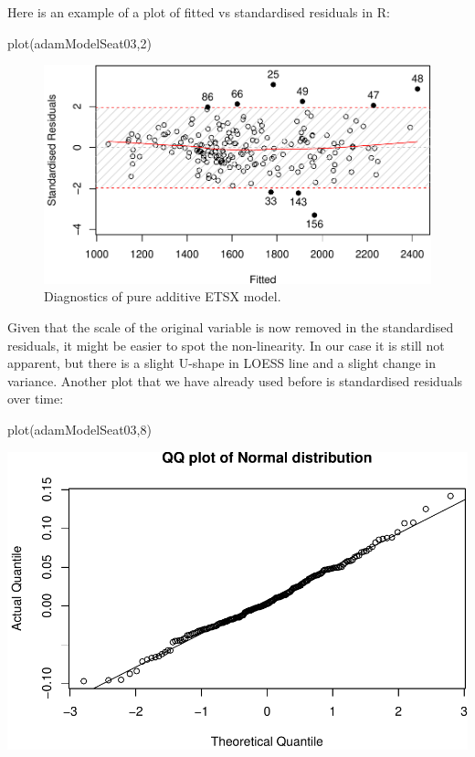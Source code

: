 \documentclass[
]{book}
\newenvironment{Shaded}{\begin{snugshade}}{\end{snugshade}}
\newcommand{\DecValTok}[1]{\textcolor[rgb]{0.00,0.00,0.81}{#1}}
\newcommand{\FunctionTok}[1]{\textcolor[rgb]{0.00,0.00,0.00}{#1}}
\newcommand{\NormalTok}[1]{#1}
\theoremstyle{definition}
\theoremstyle{definition}
\theoremstyle{definition}
\theoremstyle{definition}
\theoremstyle{remark}
\begin{document}
Here is an example of a plot of fitted vs standardised residuals in R:

\begin{Shaded}
\begin{Highlighting}[]
\FunctionTok{plot}\NormalTok{(adamModelSeat03,}\DecValTok{2}\NormalTok{)}
\end{Highlighting}
\end{Shaded}

\begin{figure}
\centering
\includegraphics{adam_files/figure-latex/adamModelSeat03Resid-1.pdf}
\caption{\label{fig:adamModelSeat03Resid}Diagnostics of pure additive ETSX model.}
\end{figure}

Given that the scale of the original variable is now removed in the standardised residuals, it might be easier to spot the non-linearity. In our case it is still not apparent, but there is a slight U-shape in LOESS line and a slight change in variance. Another plot that we have already used before is standardised residuals over time:

\begin{Shaded}
\begin{Highlighting}[]
\FunctionTok{plot}\NormalTok{(adamModelSeat03,}\DecValTok{8}\NormalTok{)}
\end{Highlighting}
\end{Shaded}

\includegraphics{adam_files/figure-latex/unnamed-chunk-138-1.pdf}
\end{document}
